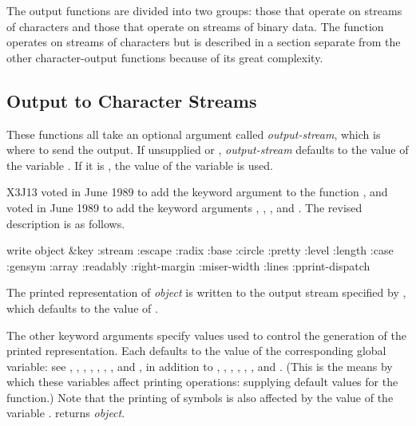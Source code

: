 The output functions are divided into two groups: those that
operate on streams of characters and those that operate on
streams of binary data.  The function  operates
on streams of characters but is described in a section
separate from the other character-output functions
because of its great complexity.

\subsection {Output to Character Streams}

These functions all take an optional argument called \emph{output-stream},
which is where to send the output.  If unsupplied or {\false}, \emph{output-stream}
defaults to the value of the variable
.  If it is {\true}, the value of the variable
 is used.

X3J13 voted in June 1989  to add the keyword argument
 to the function , and voted in June 1989 
to add the keyword arguments , , ,
and .
The revised description
is as follows.

\begin{defun}[Function]
write object &key :stream :escape :radix :base :circle
   :pretty :level :length :case :gensym :array :readably
   :right-margin :miser-width :lines :pprint-dispatch

The printed representation of \emph{object} is written to the output stream
specified by , which defaults to the value of .

The other keyword arguments specify values used to control the
generation of the printed representation.  Each defaults to the
value of the corresponding global variable: see ,
, , , ,
, , and , in addition to
,
,
,
,
,
,
and .
(This is the means by which these variables affect printing operations:
supplying default values for the  function.)
Note that the printing of symbols is also affected by the value
of the variable .
 returns \emph{object}.
\end{defun}

